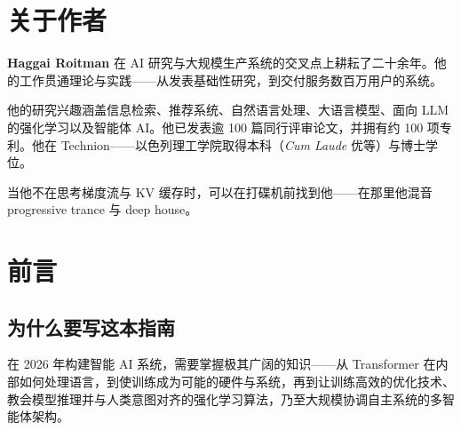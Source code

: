 \documentclass[11pt,a4paper,openany]{book}
\begin{document}
\chapter*{关于作者}
\label{about-the-author}

\textbf{Haggai Roitman} 在 AI 研究与大规模生产系统的交叉点上耕耘了二十余年。他的工作贯通理论与实践——从发表基础性研究，到交付服务数百万用户的系统。

他的研究兴趣涵盖信息检索、推荐系统、自然语言处理、大语言模型、面向 LLM 的强化学习以及智能体 AI。他已发表逾 100 篇同行评审论文，并拥有约 100 项专利。他在 Technion——以色列理工学院取得本科（\emph{Cum Laude} 优等）与博士学位。

当他不在思考梯度流与 KV 缓存时，可以在打碟机前找到他——在那里他混音 progressive trance 与 deep house。

\chapter*{前言}
\label{preface}

\section*{为什么要写这本指南}
\label{why-this-guide-exists}

在 2026 年构建智能 AI 系统，需要掌握极其广阔的知识——从 Transformer 在内部如何处理语言，到使训练成为可能的硬件与系统，再到让训练高效的优化技术、教会模型推理并与人类意图对齐的强化学习算法，乃至大规模协调自主系统的多智能体架构。
\end{document}
